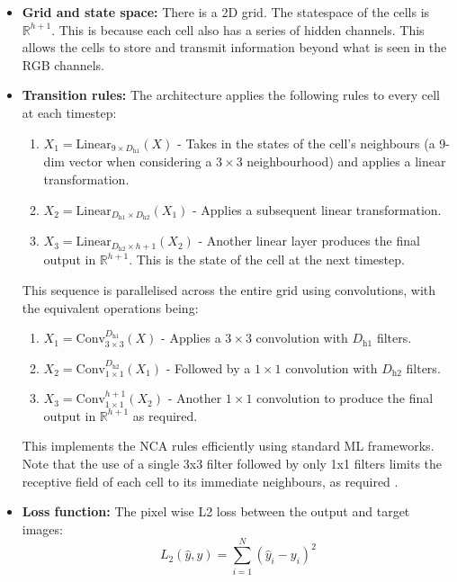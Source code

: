 \documentclass[12pt]{report}
\begin{document}
\begin{itemize}
    \item \textbf{Grid and state space:} There is a 2D grid. The statespace of the cells is $\mathbb{R}^{h+1}$. This is because each cell also has a series of hidden channels. This allows the cells to store and transmit information beyond what is seen in the RGB channels.
    \item \textbf{Transition rules:} The architecture applies the following rules to every cell at each timestep:
    \begin{enumerate}
        \item \(X_1 = \text{Linear}_{9\times D_{\text{h1}}
}(X)\) - Takes in the states of the cell's neighbours (a 9-dim vector when considering a \(3\times3\) neighbourhood) and applies a linear transformation.
        \item \(X_2 = \text{Linear}_{D_{\text{h1}}
\times D_{\text{h2}}
}(X_1)\) - Applies a subsequent linear transformation.
        \item \(X_3 = \text{Linear}_{D_{\text{h2}}
\times h+1}(X_2)\) - Another linear layer produces the final output in $\mathbb{R}^{h+1}$. This is the state of the cell at the next timestep. 
    \end{enumerate}
    This sequence is parallelised across the entire grid using convolutions, with the equivalent operations being:
    \begin{enumerate}
        \item \(X_1 = \text{Conv}_{3\times3}^{D_{\text{h1}}}(X)\) - Applies a \(3\times3\) convolution with $D_{\text{h1}}$ filters.
        \item \(X_2 = \text{Conv}_{1\times1}^{D_{\text{h2}}}(X_1)\) - Followed by a \(1\times1\) convolution with $D_{\text{h2}}$ filters.
        \item \(X_3 = \text{Conv}_{1\times1}^{h+1}(X_2)\) - Another \(1\times1\) convolution to produce the final output in $\mathbb{R}^{h+1}$ as required.  
    \end{enumerate}
    This implements the NCA rules efficiently using standard ML frameworks. Note that the use of a single 3x3 filter followed by only 1x1 filters limits the receptive field of each cell to its immediate neighbours, as required \citep{GoodBengCour16}.
    \item \textbf{Loss function:} The pixel wise L2 loss between the output and target images: 
    \begin{equation*}
        L_2(\hat{y}, y) = \sum_{i=1}^{N} (\hat{y}_i - y_i)^2
    \end{equation*}

\end{itemize}
\end{document}
